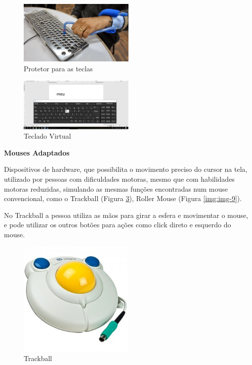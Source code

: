 \documentclass[
	12pt,			%
	openright,		%
	oneside,			%
	a4paper,			%
	chapter=TITLE,		%
	english,			%
	brazil,			%
	]{abntex2}
\begin{document}
\begin{figure}[H]
	\centering
		\includegraphics[width=0.5\textwidth]{./img/img-7.jpg}
		\caption{Protetor para as teclas}
		\label{img:img-7}
\end{figure}

\begin{figure}[H]
	\centering
		\includegraphics[width=0.5\textwidth]{./img/img-6.png}
		\caption{Teclado Virtual}
		\label{img:img-6}
\end{figure}

\textbf{Mouses Adaptados}

Dispositivos de hardware, que possibilita o movimento preciso do cursor na tela, utilizado por pessoas com dificuldades motoras, mesmo que com habilidades motoras reduzidas, simulando as mesmas funções encontradas num mouse convencional, como o Trackball (Figura \ref{img:img-8}), Roller Mouse (Figura \ref{img:img-9}).

No Trackball a pessoa utiliza as mãos para girar a esfera e movimentar o mouse, e pode utilizar os outros botões para ações como click direto e esquerdo do mouse.

\begin{figure}[H]
	\centering
		\includegraphics[width=0.5\textwidth]{./img/img-8.jpg}
		\caption{Trackball}
		\label{img:img-8}
\end{figure}
\end{document}
